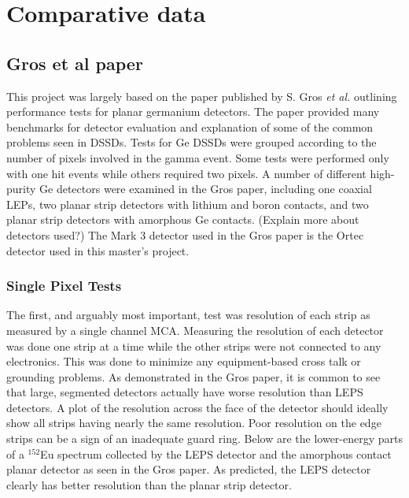 \chapter{Comparative data}
\label{ch:Comparative data}

\section{Gros et al paper}
\indent This project was largely based on the paper published by S. Gros \textit{et al.} \cite{SG09} outlining performance tests for planar germanium detectors. The paper provided many benchmarks for detector evaluation and explanation of some of the common problems seen in DSSDs. Tests for Ge DSSDs were grouped according to the number of pixels involved in the gamma event. Some tests were performed only with one hit events while others required two pixels. A number of different high-purity Ge detectors were examined in the Gros paper, including one coaxial LEPs, two planar strip detectors with lithium and boron contacts, and two planar strip detectors with amorphous Ge contacts. (Explain more about detectors used?) The Mark 3 detector used in the Gros paper is the Ortec detector used in this master's project.

\subsection{Single Pixel Tests}
\indent The first, and arguably most important, test was resolution of each strip as measured by a single channel MCA. Measuring the resolution of each detector was done one strip at a time while the other strips were not connected to any electronics. This was done to minimize any equipment-based cross talk or grounding problems.\cite{SG09} As demonstrated in the Gros paper, it is common to see that large, segmented detectors actually have worse resolution than LEPS detectors. A plot of the resolution across the face of the detector should ideally show all strips having nearly the same resolution.  Poor resolution on the edge strips can be a sign of an inadequate guard ring. \cite{SG09} Below are the lower-energy parts of a $^{152}$Eu spectrum collected by the LEPS detector and the amorphous contact planar detector as seen in the Gros paper. As predicted, the LEPS detector clearly has better resolution than the planar strip detector. 

